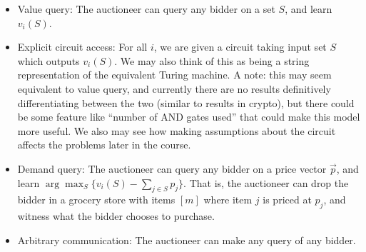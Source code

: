 \documentclass[12pt]{article}%
\begin{document}
\begin{itemize}
\item Value query: The auctioneer can query any bidder on a set $S$, and learn $v_i(S)$.
\item Explicit circuit access: For all $i$, we are given a circuit taking input set $S$ which outputs $v_i(S)$. We may also think of this as being a string representation of the equivalent Turing machine. A note: this may seem equivalent to value query, and currently there are no results definitively differentiating between the two (similar to results in crypto), but there could be some feature like ``number of AND gates used'' that could make this model more useful. We also may see how making assumptions about the circuit affects the problems later in the course.
\item Demand query: The auctioneer can query any bidder on a price vector $\vec{p}$, and learn $\arg\max_S \{v_i(S) - \sum_{j \in S} p_j\}$. That is, the auctioneer can drop the bidder in a grocery store with items $[m]$ where item $j$ is priced at $p_j$, and witness what the bidder chooses to purchase.
\item Arbitrary communication: The auctioneer can make any query of any bidder.
\end{itemize}
\end{document}
